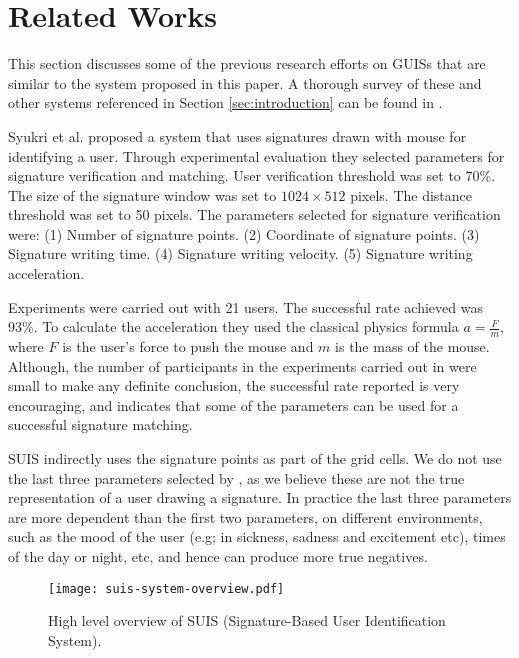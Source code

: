 \documentclass[conference]{IEEEtran}
\begin{document}
\section{Related Works}\label{sec:literature-review}

This section discusses some of the previous research efforts on GUISs that are similar to the system proposed in this paper. A thorough survey of these and other systems referenced in Section \ref{sec:introduction} can be found in \cite{gp-survey-acm,gp-survey-ieee}.

Syukri et al. \cite{signature-gp} proposed a system that uses signatures drawn with mouse for identifying a user. Through experimental evaluation they selected parameters for signature verification and matching. User verification threshold was set to 70\%. The size of the signature window was set to $1024 \times 512$ pixels. The distance threshold was set to 50 pixels. The parameters selected for signature verification were:
(1) Number of signature points.
(2) Coordinate of signature points.
(3) Signature writing time.
(4) Signature writing velocity.
(5) Signature writing acceleration.

Experiments were carried out with 21 users. The successful rate achieved was 93\%. To calculate the acceleration they used the classical physics formula $a = \frac{F}{m}$, where $F$ is the user's force to push the mouse and $m$ is the mass of the mouse. Although, the number of participants in the experiments carried out in \cite{signature-gp} were small to make any definite conclusion, the successful rate reported is very encouraging, and indicates that some of the parameters can be used for a successful signature matching.

SUIS indirectly uses the signature points as part of the grid cells. We do not use the last three parameters selected by \cite{signature-gp}, as we believe these are not the true representation of a user drawing a signature. In practice the last three parameters are more dependent than the first two parameters, on different environments, such as the mood of the user (e.g; in sickness, sadness and excitement etc), times of the day or night, etc, and hence can produce more true negatives.


\begin{figure*}[htbp]
\centering
   {\texttt{[image: suis-system-overview.pdf]}}
\caption{High level overview of SUIS (Signature-Based User Identification System).}
\label{fig:suis-system-overview}
\end{figure*}
\end{document}
